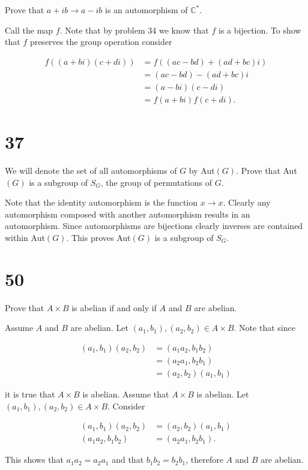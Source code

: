 \documentclass[a4paper]{article}
\begin{document}
Prove that $a + ib \rightarrow a- ib$ is an automorphism of $\mathbb{C}^*$.

\vspace{\baselineskip}

Call the map $f$. Note that by problem 34 we know that $f$ is a bijection. To show that $f$ preserves the group operation consider

\begin{align*}
f((a+bi) (c+di)) &= f((ac - bd) + (ad + bc)i) \\
&= (ac - bd) - (ad + bc)i \\
&= (a-bi)(c-di) \\
&= f(a+bi) f(c+di).
\end{align*}


\section*{37}

We will denote the set of all automorphisms of $G$ by Aut$(G)$. Prove that Aut$(G)$ is a subgroup of $S_G$, the group of permutations of $G$.

\vspace{\baselineskip}

Note that the identity automorphism is the function $x \rightarrow x$. Clearly any automorphism composed with another automorphism results in an automorphism. Since automorphisms are bijections clearly inverses are contained within Aut$(G)$. This proves Aut$(G)$ is a subgroup of $S_G$.


\section*{50}

Prove that $A \times B$ is abelian if and only if $A$ and $B$ are abelian.

\vspace{\baselineskip}

Assume $A$ and $B$ are abelian. Let $(a_1, b_1), (a_2, b_2) \in A \times B$. Note that since

\begin{align*}
(a_1, b_1) (a_2, b_2) &= (a_1 a_2, b_1 b_2) \\
&= (a_2 a_1, b_2 b_1) \\
&= (a_2, b_2) (a_1, b_1)
\end{align*}

it is true that $A \times B$ is abelian. Assume that $A \times B$ is abelian. Let $(a_1, b_1), (a_2, b_2) \in A \times B$. Consider

\begin{align*}
(a_1, b_1) (a_2, b_2) &= (a_2, b_2) (a_1, b_1) \\ 
(a_1 a_2, b_1 b_2) &= (a_2 a_1, b_2 b_1).
\end{align*}

This shows that $a_1 a_2 = a_2 a_1$ and that $b_1 b_2 = b_2 b_1$, therefore $A$ and $B$ are abelian.
\end{document}
